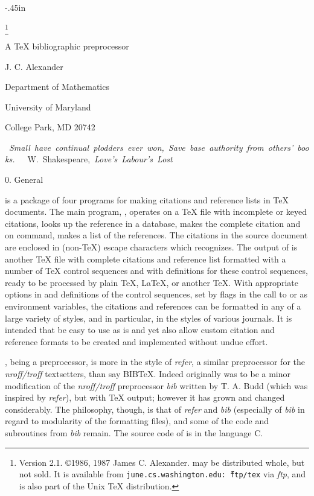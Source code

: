 \def\[#1]{\leavevmode\hbox{\tt[#1]}}
\def\({\/\rm(}\def\){\/\rm)}
\newdimen\tableindent\newdimen\leftbox
\def\tableset{\tableindent=\leftbox\advance\tableindent by 20pt
    \leftskip\tableindent\rightskip10pt\parindent=0pt}
\def\tableentry#1{%
    \setbox0\hbox{{\tt\tablemark#1}\hss}\wd0=\leftbox
    \item{\box0}}
\def\listitem{\tt\obeylines\obeyspaces\parindent20pt}

{}\vglue-.45in
\centerline{\bfTib\footnote*{Version 2.1. \copyright 1986, 1987
James C. Alexander.
\Tib{} may be distributed whole, but not sold.  It
is available from {\tt june.cs.washington.edu:\~\ ftp/tex\/} via {\it ftp},
and is also part of the Unix TeX distribution.}}
\bigskip
\centerline{A \TeX{} bibliographic preprocessor}
\bigskip
{\baselineskip10pt
\centerline{J. C. Alexander}
\smallskip
\centerline{Department of Mathematics}
\centerline{University of Maryland}
\centerline{College Park, MD 20742}}

\bigskip\hfill\hbox{\vbox{\baselineskip10pt
\hbox{\it Small have continual plodders ever won,}
\hbox{\it Save base authority from others{\rm'} books.}
\smallskip
\hbox{\ \ W. Shakespeare, \it Love{\rm'}s Labour{\rm'}s Lost}}}

 0. General

\Tib{} is a package of four programs for making citations and reference
lists in \TeX{} documents.  The main program, \Tib, operates on a \TeX{}
file with incomplete or keyed citations, looks up the reference in a
database, makes the complete citation and on command, makes a list of
the references.  The citations in the source document
are enclosed in (non-\TeX) escape characters
which \Tib{} recognizes.  The output of \Tib{} is another \TeX{} file with
complete citations and reference list formatted with a number of \TeX{} control
sequences and with definitions for these control sequences, ready
to be processed by plain \TeX, \LaTeX, or another \TeX.  With appropriate
options in \Tib{} and definitions of the control sequences, set by
flags in the call to \Tib{} or as environment variables,
the citations and references can be formatted in any
of a large variety of styles, and in particular, in the styles of various 
journals.  It is intended that \Tib{} be easy to use as is and yet also allow
custom citation and reference formats to be created and implemented
without undue effort.

\Tib, being a preprocessor, is more in the style of {\it refer\/}, a similar
preprocessor for the {\it nroff{\rm/}troff\/} textsetters, than say
B{\sevenrm I}B\TeX.  Indeed \Tib{} originally was to be a minor
modification of the {\it nroff{\rm/}troff\/} preprocessor {\it bib\/}
written by T. A. Budd (which was inspired by {\it refer\/}),
but with \TeX{} output; however it has grown and changed
considerably. The philosophy, though, is that of {\it refer\/} and {\it bib\/}
(especially of {\it bib\/} in regard to modularity of the formatting files),
and some of the code and subroutines from {\it bib\/} remain.
The source code of \Tib{} is in the language C.

\]
